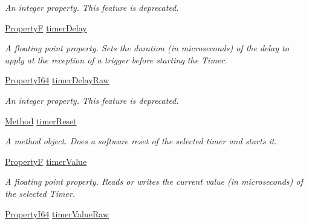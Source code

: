 \begin{DoxyCompactItemize}
\begin{DoxyCompactList}\small\item\em An integer property. This feature is deprecated. \end{DoxyCompactList}\item 
\hyperlink{group___common_interface_gaf54865fe5a3d5cfd15f9a111b40d09f9}{Property\+F} \hyperlink{classmv_i_m_p_a_c_t_1_1acquire_1_1_gen_i_cam_1_1_counter_and_timer_control_aed0a836e1b087f5d8977334073e34788}{timer\+Delay}
\begin{DoxyCompactList}\small\item\em A floating point property. Sets the duration (in microseconds) of the delay to apply at the reception of a trigger before starting the Timer. \end{DoxyCompactList}\item 
\hyperlink{group___common_interface_ga81749b2696755513663492664a18a893}{Property\+I64} \hyperlink{classmv_i_m_p_a_c_t_1_1acquire_1_1_gen_i_cam_1_1_counter_and_timer_control_ae2a98a11b7a8ffd4379474d8d2118564}{timer\+Delay\+Raw}
\begin{DoxyCompactList}\small\item\em An integer property. This feature is deprecated. \end{DoxyCompactList}\item 
\hyperlink{classmv_i_m_p_a_c_t_1_1acquire_1_1_method}{Method} \hyperlink{classmv_i_m_p_a_c_t_1_1acquire_1_1_gen_i_cam_1_1_counter_and_timer_control_a5b4a47b49eeeb512aa34c9a9118fd378}{timer\+Reset}
\begin{DoxyCompactList}\small\item\em A method object. Does a software reset of the selected timer and starts it. \end{DoxyCompactList}\item 
\hyperlink{group___common_interface_gaf54865fe5a3d5cfd15f9a111b40d09f9}{Property\+F} \hyperlink{classmv_i_m_p_a_c_t_1_1acquire_1_1_gen_i_cam_1_1_counter_and_timer_control_a21f6143f2f21f2d22394455a9df22a42}{timer\+Value}
\begin{DoxyCompactList}\small\item\em A floating point property. Reads or writes the current value (in microseconds) of the selected Timer. \end{DoxyCompactList}\item 
\hyperlink{group___common_interface_ga81749b2696755513663492664a18a893}{Property\+I64} \hyperlink{classmv_i_m_p_a_c_t_1_1acquire_1_1_gen_i_cam_1_1_counter_and_timer_control_a550a983e7334e89b755076bcee3cf80d}{timer\+Value\+Raw}

\end{DoxyCompactItemize}
